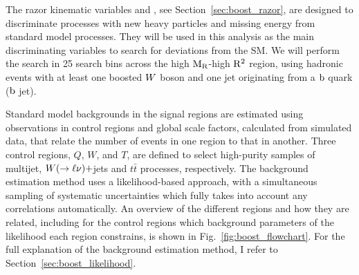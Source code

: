 The razor kinematic variables \mr and \rsq, see Section~\ref{sec:boost_razor}, are designed to
discriminate processes with new heavy particles and missing energy from standard model processes.
They will be used in this analysis as the main discriminating variables to search for deviations
from the SM. We will perform the search in 25 search bins across the high $\mathrm{M_R}$-high $\mathrm{R^2}$ region,
using hadronic events with at least one boosted $W$ boson and one jet originating from a $\mathrm{b}$
quark (\ie $\mathrm{b}$ jet). 

Standard model backgrounds in the signal regions are estimated using observations in control regions
and global scale factors, calculated from simulated data, that relate the number of events in one
region to that in another. 
Three control regions, $Q$, $W$, and $T$, are defined to select high-purity samples of multijet,
$W(\rightarrow \ell\nu)+$jets and $t\bar{t}$ processes, respectively.  
The background estimation method uses a likelihood-based approach, with a simultaneous sampling
of systematic uncertainties which fully takes into account any correlations automatically.
An overview of the different regions and how they are related, including for the control regions
which background parameters of the likelihood each region constrains, is shown in
Fig.~\ref{fig:boost_flowchart}. For the full explanation of the background estimation method, I
refer to Section~\ref{sec:boost_likelihood}. 

